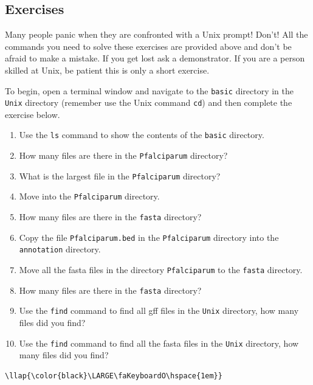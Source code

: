 \documentclass[11pt]{article}
\providecommand{\tightlist}{%
      \setlength{\itemsep}{0pt}\setlength{\parskip}{0pt}}
\begin{document}
    \hypertarget{exercises}{%
\subsection{Exercises}\label{exercises}}

Many people panic when they are confronted with a Unix prompt! Don't!
All the commands you need to solve these exercises are provided above
and don't be afraid to make a mistake. If you get lost ask a
demonstrator. If you are a person skilled at Unix, be patient this is
only a short exercise.

To begin, open a terminal window and navigate to the \texttt{basic}
directory in the \texttt{Unix} directory (remember use the Unix command
\texttt{cd}) and then complete the exercise below.

\begin{enumerate}
\def\labelenumi{\arabic{enumi}.}
\tightlist
\item
  Use the \texttt{ls} command to show the contents of the \texttt{basic}
  directory.
\item
  How many files are there in the \texttt{Pfalciparum} directory?
\item
  What is the largest file in the \texttt{Pfalciparum} directory?
\item
  Move into the \texttt{Pfalciparum} directory.
\item
  How many files are there in the \texttt{fasta} directory?
\item
  Copy the file \texttt{Pfalciparum.bed} in the \texttt{Pfalciparum}
  directory into the \texttt{annotation} directory.
\item
  Move all the fasta files in the directory \texttt{Pfalciparum} to the
  \texttt{fasta} directory.
\item
  How many files are there in the \texttt{fasta} directory?
\item
  Use the \texttt{find} command to find all gff files in the
  \texttt{Unix} directory, how many files did you find?
\item
  Use the \texttt{find} command to find all the fasta files in the
  \texttt{Unix} directory, how many files did you find?
\end{enumerate}

\begin{terminalinput}
\begin{Verbatim}[commandchars=\\\{\}]
\llap{\color{black}\LARGE\faKeyboardO\hspace{1em}}
\end{Verbatim}
\end{terminalinput}
\end{document}
